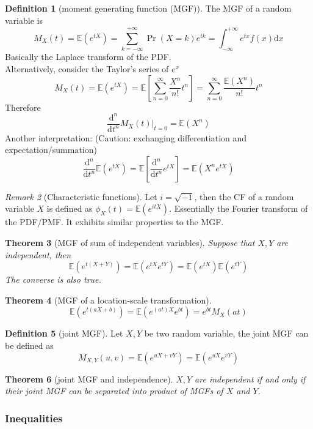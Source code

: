 \documentclass{article}
\newtheorem{theorem}{Theorem}[section]
\theoremstyle{definition}
\newtheorem{definition}[theorem]{Definition}
\theoremstyle{remark}
\newtheorem{remark}[theorem]{Remark}
\newcommand{\E}{\mathbb{E}}
\newcommand{\intoo}{\int_{-\infty}^{+\infty}}
\newcommand{\dx}{\mathrm{d}x}
\begin{document}
\begin{definition}[moment generating function (MGF)]
	The MGF of a random variable is
	\[
		M_X(t) = \E(e^{tX})
		= \sum_{k=-\infty}^{+\infty} \Pr(X=k) e^{tk}
		= \intoo e^{tx}f(x)\dx
	\]
	Basically the Laplace transform of the PDF.\\
	Alternatively, consider the Taylor's series of \(e^x\)
	\[
		M_X(t) = \E(e^{tX}) = \E\left[\sum_{n=0}^\infty \frac{X^n}{n!}t^n \right] = \sum_{n=0}^\infty \frac{\E(X^n)}{n!}t^n
	\]
	Therefore
	\[
		\frac{\mathrm{d}^n}{\mathrm{d}t^n}M_X(t) \vert_{t=0} = \E(X^n)
	\]
	Another interpretation: (Caution: exchanging differentiation and expectation/summation)
	\[
		\frac{\mathrm{d}^n}{\mathrm{d}t^n}\E(e^{tX}) = \E\left[\frac{\mathrm{d}^n}{\mathrm{d}t^n} e^{tX}\right] = \E(X^n e^{tX})
	\]
\end{definition}
\begin{remark}[Characteristic functions]
	Let \(i = \sqrt{-1}\), then the CF of a random variable \(X\) is defined as
	\( \phi_X(t) = \E(e^{itX}) \).
	Essentially the Fourier transform of the PDF/PMF.
	It exhibits similar properties to the MGF.
\end{remark}
\begin{theorem}[MGF of sum of independent variables]
	Suppose that \(X,Y\) are independent, then
	\[
		\E(e^{t(X+Y)}) = \E(e^{tX} e^{tY}) = \E(e^{tX}) \E(e^{tY})
	\]
	The converse is also true.
\end{theorem}
\begin{theorem}[MGF of a location-scale transformation]
	\[
		\E(e^{t(aX+b)}) = \E(e^{(at)X} e^{bt}) = e^{bt} M_X(at)
	\]
\end{theorem}

\begin{definition}[joint MGF]
	Let \(X,Y\) be two random variable, the joint MGF can be defined as
	\[
		M_{X,Y}(u,v) = \E(e^{uX + vY}) = \E(e^{uX} e^{vY})
	\]
\end{definition}
\begin{theorem}[joint MGF and independence]
	\(X,Y\) are independent if and only if their joint MGF can be separated into product of MGFs of \(X\) and \(Y\).
\end{theorem}

\subsubsection{Inequalities}
\end{document}
